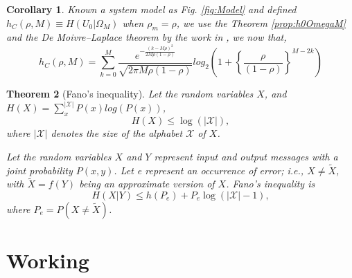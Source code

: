 \documentclass[a4paper,10pt]{article}
\newtheorem{mytheorem}{Theorem}
\newtheorem{corollary}[mytheorem]{Corollary}
\begin{document}
\begin{mdframed}[style=MDFStyGrayScreen]
\begin{corollary}
 \label{coro:h0OmegaM}
 Known a system model as Fig. \ref{fig:Model} and defined $h_{C}(\rho,M)\equiv H(U_0|\Omega_M)$ 
 when $\rho_m=\rho$, we use the Theorem \ref{prop:h0OmegaM} and the De Moivre–Laplace theorem
 by the work in \cite[p.~37]{shu0omega}, we now that,
\begin{equation}\label{eq:h0OmegaMC}
h_{C}(\rho,M)  = \sum_{k=0}^M \frac{e^{-\frac{(k-M\rho)^2}{2M\rho(1-\rho)}}}{\sqrt{2\pi M \rho (1-\rho)}}  log_2\left ( 1 + \left\{\frac{\rho}{(1-\rho)}\right\}^{M-2k} \right )    
\end{equation}
\end{corollary}
\end{mdframed}

\begin{mdframed}[style=MDFStyGrayScreen]
\begin{mytheorem}[Fano's inequality]
 \label{teo:FanoInequality}
Let the random variables $X$, and $ H(X)=\sum_{x}^{|{\mathcal {X}}|} P(x)log(P(x))$,
\begin{equation}\label{eq:FanoInequality1}
 H(X)\leq \log(|{\mathcal {X}}|), 
\end{equation}
where $|\mathcal {X}|$ denotes the size of the alphabet ${\mathcal {X}}$ of $X$.


 
Let the random variables $X$ and $Y$ represent input and output messages with a 
joint probability $P(x,y)$. 
Let e represent an occurrence of error; i.e.,  $X \neq {\tilde {X}}$, 
with $\tilde {X}=f(Y)$ being an approximate version of $X$. Fano's inequality is
\begin{equation}\label{eq:FanoInequality2}
 H(X|Y)\leq h(P_e)+P_e\log(|{\mathcal {X}}|-1), 
\end{equation}
where $P_e=P(X \neq {\tilde {X}})$.
\end{mytheorem}
\end{mdframed}

\section{Working}
\label{sec:working}
\end{document}
